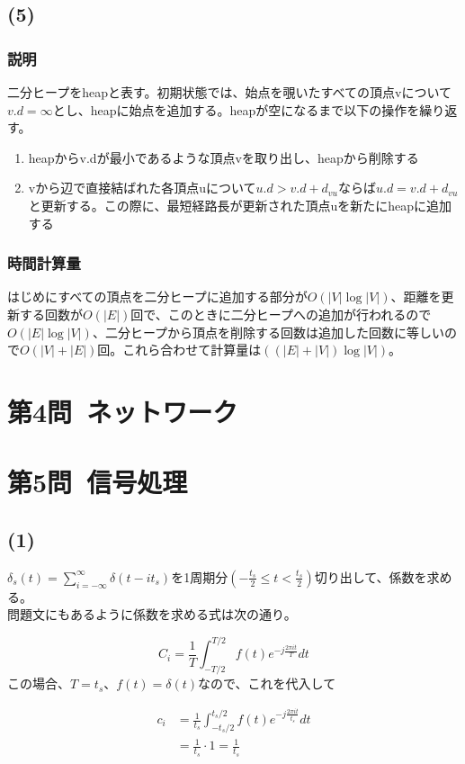 \documentclass[a4paper,12pt,xelatex,ja=standard]{bxjsarticle}
\begin{document}
\subsection*{(5)}
\subsubsection*{説明}
二分ヒープをheapと表す。初期状態では、始点を覗いたすべての頂点vについて$v.d = \infty$とし、heapに始点を追加する。heapが空になるまで以下の操作を繰り返す。

\begin{enumerate}
  \item heapからv.dが最小であるような頂点vを取り出し、heapから削除する
  \item vから辺で直接結ばれた各頂点uについて$u.d > v.d + d_{vu}$ならば$u.d = v.d + d_{vu}$と更新する。この際に、最短経路長が更新された頂点uを新たにheapに追加する
\end{enumerate}

\subsubsection*{時間計算量}
はじめにすべての頂点を二分ヒープに追加する部分が$O(|V| \log |V|)$、距離を更新する回数が$O(|E|)$回で、このときに二分ヒープへの追加が行われるので$O(|E| \log |V|)$、二分ヒープから頂点を削除する回数は追加した回数に等しいので$O(|V| + |E|)$回。これら合わせて計算量は$((|E| + |V|) \log |V|)$。

\section*{第4問\ ネットワーク}

\section*{第5問\ 信号処理}
\subsection*{(1)}
$\delta_s(t) = \sum^{\infty}_{i = - \infty} \delta(t - it_s)$を1周期分$\left( -\frac{t_s}{2} \leq t < \frac{t_s}{2}\right)$切り出して、係数を求める。\\
問題文にもあるように係数を求める式は次の通り。

\[
  C_i = \frac{1}{T}\int^{T/2}_{-T/2}f(t) e^{-j \frac{2 \pi i t}{T}}dt
\]
この場合、$T = t_s$、$f(t) = \delta(t)$なので、これを代入して

\begin{equation*}
  \begin{split}
    c_i
      &= \frac{1}{t_s}\int^{t_s/2}_{-t_s/2}f(t) e^{-j \frac{2 \pi i t}{t_s}}dt \\
      &= \frac{1}{t_s} \cdot 1 = \frac{1}{t_s}
  \end{split}
\end{equation*}
\end{document}
